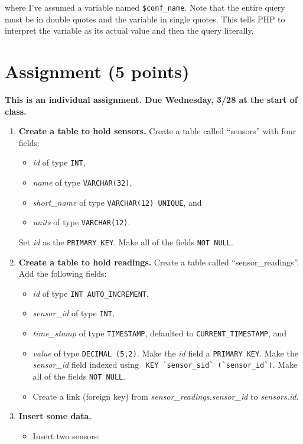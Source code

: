 \documentclass[11pt]{article} %
\begin{document}
where I’ve assumed a variable named \verb|$conf_name|. Note that the entire query must be in double quotes and the variable in single quotes. This tells PHP to interpret the variable as its actual value and then the query literally.

\clearpage
\section*{Assignment (5 points)}

{\bf This is an individual assignment. Due Wednesday, 3/28 at the start of class.} 

\begin{enumerate}
\item {\bf Create a table to hold sensors.} Create a table called ``sensors'' with four fields:
\begin{itemize}
\item \emph{id} of type \verb|INT|,
\item \emph{name} of type \verb|VARCHAR(32)|,
\item \emph{short\_name} of type \verb|VARCHAR(12) UNIQUE|, and
\item \emph{units} of type \verb|VARCHAR(12)|.
\end{itemize}
Set \emph{id} as the \verb|PRIMARY KEY|. Make all of the fields \verb|NOT NULL|.
\item {\bf Create a table to hold readings.} Create a table called ``sensor\_readings''. Add the following fields:
\begin{itemize}
\item \emph{id} of type \verb|INT AUTO_INCREMENT|,
\item \emph{sensor\_id} of type \verb|INT|,
\item \emph{time\_stamp} of type \verb|TIMESTAMP|, defaulted to \verb|CURRENT_TIMESTAMP|, and
\item \emph{value} of type \verb|DECIMAL (5,2)|. Make the \emph{id} field a \verb|PRIMARY KEY|. Make the \emph{sensor\_id} field indexed using \verb| KEY `sensor_sid` (`sensor_id`)|. Make all of the fields \verb|NOT NULL|.
\item Create a link (foreign key) from \emph{sensor\_readings.sensor\_id} to \emph{sensors.id}.
\end{itemize}
\item {\bf Insert some data.} 
\begin{itemize}
\item Insert two sensors: 
\begin{enumerate}

\end{enumerate}
\end{itemize}
\end{enumerate}
\end{document}
